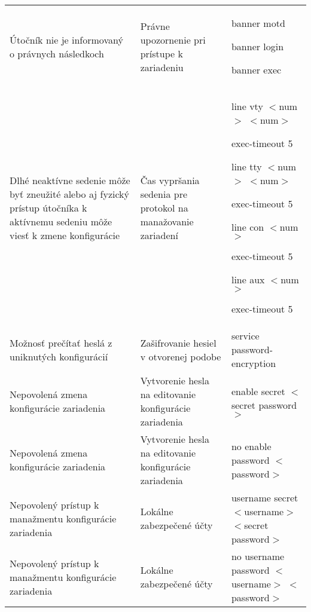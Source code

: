 \begin{longtable}[!htbp]{|L{10em}L{10em}>{\selectfont}L{34em}|}
	
	 Útočník nie je informovaný o právnych následkoch	&Právne upozornenie pri prístupe k zariadeniu	&banner motd
	
	banner login
	
	banner exec\\
	
	
	
	Dlhé neaktívne sedenie môže byť zneužité alebo aj fyzický prístup útočníka k aktívnemu sedeniu môže viesť k zmene konfigurácie	&Čas vypršania sedenia pre protokol na manažovanie zariadení	&line vty $<$num$>$ $<$num$>$
	
	exec-timeout 5
	\vspace{0.5em}
	
	line tty $<$num$>$ $<$num$>$
	
	\hspace{0.5em}exec-timeout 5
	\vspace{0.5em}
	
	line con $<$num$>$
	
	\hspace{0.5em}exec-timeout 5
	\vspace{0.5em}
	
	line aux $<$num$>$
	
	\hspace{0.5em}exec-timeout 5\\
	
	
	
	
	 Možnosť prečítať heslá z uniknutých konfigurácií	&Zašifrovanie hesiel v otvorenej podobe	&service password-encryption\\
	
	
	
	
	Nepovolená zmena konfigurácie zariadenia	&Vytvorenie hesla na editovanie konfigurácie zariadenia	&enable secret $<$secret password$>$\\
	
	
	
	
	 Nepovolená zmena konfigurácie zariadenia	&Vytvorenie hesla na editovanie konfigurácie zariadenia	&no enable password $<$password$>$\\
	
	
	
	Nepovolený prístup k manažmentu konfigurácie zariadenia	&Lokálne zabezpečené účty	&username secret $<$username$>$ $<$secret password$>$\\
	
	
	
	 Nepovolený prístup k manažmentu konfigurácie zariadenia	&Lokálne zabezpečené účty	&no username password  $<$username$>$ $<$password$>$\\
	

\end{longtable}
